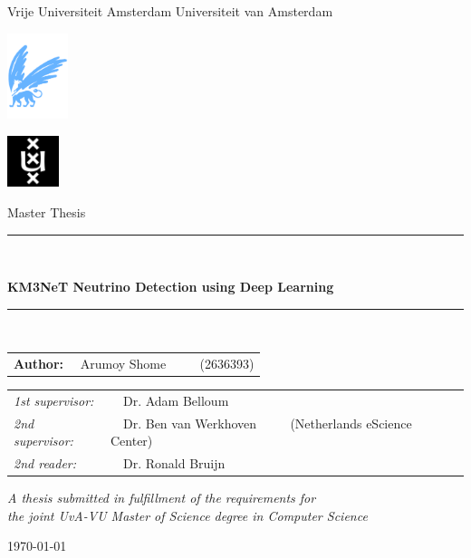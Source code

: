 \documentclass[twoside,11pt]{Latex/Classes/PhDthesisPSnPDF}
\begin{document}
\thispagestyle{empty}

\begin{center}

Vrije Universiteit Amsterdam \hspace*{2cm} Universiteit van Amsterdam

\vspace{1mm}

\hspace*{-7.5cm}\includegraphics[height=25mm]{vu-griffioen.pdf}

\vspace*{-2cm}\hspace*{7.5cm}\includegraphics[height=15mm]{uva_logo.jpg}

\vspace{2cm}

{\Large Master Thesis}

\vspace*{1.5cm}

\rule{.9\linewidth}{.6pt}\\[0.4cm]
{\huge \bfseries KM3NeT Neutrino Detection using Deep Learning \par}\vspace{0.4cm}
\rule{.9\linewidth}{.6pt}\\[1.5cm]

\vspace*{2mm}

{\Large
\begin{tabular}{l}
{\bf Author:} ~~Arumoy Shome ~~~~ (2636393)
\end{tabular}
}

\vspace*{2cm}

\begin{tabular}{ll}
{\it 1st supervisor:}   & ~~Dr. Adam Belloum \\
{\it 2nd supervisor:} & ~~Dr. Ben van Werkhoven ~~~~ (Netherlands eScience
Center) \\
{\it 2nd reader:}       & ~~Dr. Ronald Bruijn
\end{tabular}

\vspace*{2.5cm}

\textit{A thesis submitted in fulfillment of the requirements for\\ the joint UvA-VU Master of Science degree in Computer Science}

\vspace*{1.8cm}

\today\\[4cm] %

\end{center}
\end{document}
